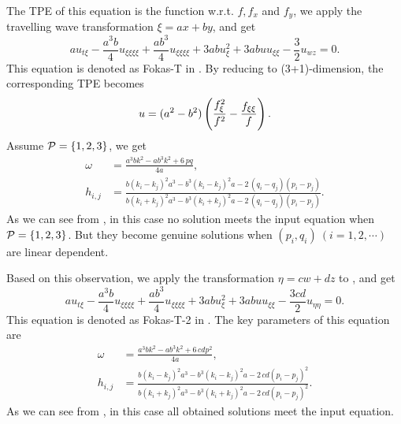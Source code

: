 The TPE of this equation is the function w.r.t. $f,f_x$ and $f_y$, we apply the travelling wave transformation $\xi=ax+by$, and get
\begin{equation}
    au_{t\xi}-\frac{a^3b}{4}u_{\xi\xi\xi\xi}+\frac{ab^3}{4}u_{\xi\xi\xi\xi}+3abu_{\xi}^2+3abuu_{\xi\xi}-\frac{3}{2}u_{wz}=0.  \label{Fork-T}
\end{equation}
This equation is denoted as Fokas-T in . By reducing to (3+1)-dimension, the  corresponding TPE becomes
\begin{equation}
    u=(a^2-b^2)\left(\frac{f_{\xi}^2}{f^2}-\frac{f_{\xi\xi}}{f}\right).
\end{equation}
Assume $\mathcal{P}=\{1,2,3\}$, we get
\begin{equation}
\begin{split}
    \omega&={\frac {{a}^{3}b{k}^{2}-a{b}^{3}{k}^{2}+6\,pq}{4a}}, \\
    h_{{i,j}}&={\frac {b \left( k_{{i}}-k_{{j}} \right) ^{2}{a}^{3}-{b}^{3}
    \left( k_{{i}}-k_{{j}} \right) ^{2}a-2\, \left( q_{{i}}-q_{{j}}
    \right)  \left( p_{{i}}-p_{{j}} \right) }{b \left( k_{{i}}+k_{{j}}
    \right) ^{2}{a}^{3}-{b}^{3} \left( k_{{i}}+k_{{j}} \right) ^{2}a-2\,
    \left( q_{{i}}-q_{{j}} \right)  \left( p_{{i}}-p_{{j}} \right) }}.
\end{split}
\end{equation}
As we can see from , in this case no solution meets the input equation when $\mathcal{P}=\{1,2,3\}$. But they become genuine solutions when $(p_i,q_i)~(i=1,2,\cdots)$ are linear dependent.

Based on this observation, we apply the transformation $\eta=cw+dz$ to , and get
\begin{equation}
    au_{t\xi}-\frac{a^3b}{4}u_{\xi\xi\xi\xi}+\frac{ab^3}{4}u_{\xi\xi\xi\xi}+3abu_{\xi}^2+3abuu_{\xi\xi}-\frac{3cd}{2}u_{\eta\eta}=0.  \label{Fokas-T-2}
\end{equation}
This equation is denoted as Fokas-T-2 in . The key parameters of this equation are
\begin{equation}
\begin{split}
    \omega&={\frac {{a}^{3}b{k}^{2}-a{b}^{3}{k}^{2}+6\,cd{p}^{2}}{4a}}, \\ 
    h_{{i,j}}&={\frac {b \left( k_{{i}}-k_{{j}} \right) ^{2}{a}^{3}-{b}^{3}
    \left( k_{{i}}-k_{{j}} \right) ^{2}a-2\,cd \left( p_{{i}}-p_{{j}}
    \right) ^{2}}{b \left( k_{{i}}+k_{{j}} \right) ^{2}{a}^{3}-{b}^{3}
    \left( k_{{i}}+k_{{j}} \right) ^{2}a-2\,cd \left( p_{{i}}-p_{{j}}
    \right) ^{2}}}.
\end{split}
\end{equation}
As we can see from , in this case all obtained solutions meet the input equation.


